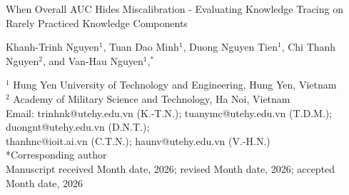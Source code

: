 \documentclass[10pt,a4paper]{article}
\begin{document}
\normalsize
\begin{center}
{\fontsize{20}{24}\selectfont When Overall AUC Hides Miscalibration - Evaluating Knowledge Tracing on Rarely Practiced Knowledge Components\par}
\vspace{22pt}
{\fontsize{11}{13}\selectfont Khanh-Trinh Nguyen$^{1}$, Tuan Dao Minh$^{1}$, Duong Nguyen Tien$^{1}$, Chi Thanh Nguyen$^{2}$, and Van-Hau Nguyen$^{1}$,$^{*}$\par}
\vspace{0.25em}
{\fontsize{9}{11}\selectfont $^{1}$ Hung Yen University of Technology and Engineering, Hung Yen, Vietnam\\
$^{2}$ Academy of Military Science and Technology, Ha Noi, Vietnam\\
Email: trinhnk@utehy.edu.vn (K.-T.N.); tuanymc@utehy.edu.vn (T.D.M.); duongnt@utehy.edu.vn (D.N.T.);\\
thanhnc@ioit.ai.vn (C.T.N.); haunv@utehy.edu.vn (V.-H.N.)\\
*Corresponding author\\
Manuscript received Month date, 2026; revised Month date, 2026; accepted Month date, 2026\par}
\end{center}
\vspace{0.4em}
\end{document}
